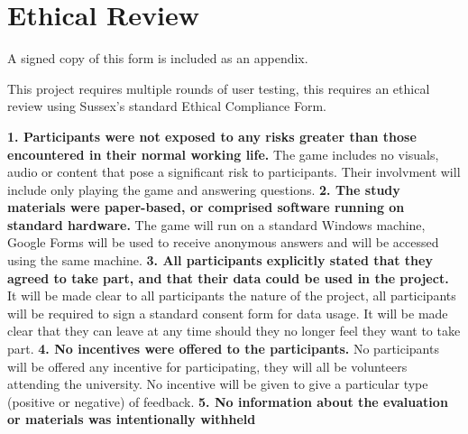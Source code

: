 \documentclass{report}
\begin{document}
\section{Ethical Review}

A signed copy of this form is included as an appendix.

This project requires multiple rounds of user testing, this requires an ethical review using Sussex's standard Ethical Compliance Form.
\begin{raggedright}
\newline
\newline
\textbf{1. Participants were not exposed to any risks greater than those
encountered in their normal working life.}
\newline
\newline
The game includes no visuals, audio or content that pose a significant risk to participants. Their involvment will include only playing the game and answering questions.
\newline
\newline
\textbf{2. The study materials were paper-based, or comprised software
running on standard hardware.}
\newline
\newline
The game will run on a standard Windows machine, Google Forms will be used to receive anonymous answers and will be accessed using the same machine.
\newline
\newline
\textbf{3. All participants explicitly stated that they agreed to take part,
and that their data could be used in the project.}
\newline
\newline
It will be made clear to all participants the nature of the project, all participants will be required to sign a standard consent form for data usage. It will be made clear that they can leave at any time should they no longer feel they want to take part.
\newline
\newline
\textbf{4. No incentives were offered to the participants.}
\newline
\newline
No participants will be offered any incentive for participating, they will all be volunteers attending the university. No incentive will be given to give a particular type (positive or negative) of feedback.
\newline
\newline
\textbf{5. No information about the evaluation or materials was intentionally withheld
}
\end{raggedright}
\end{document}
